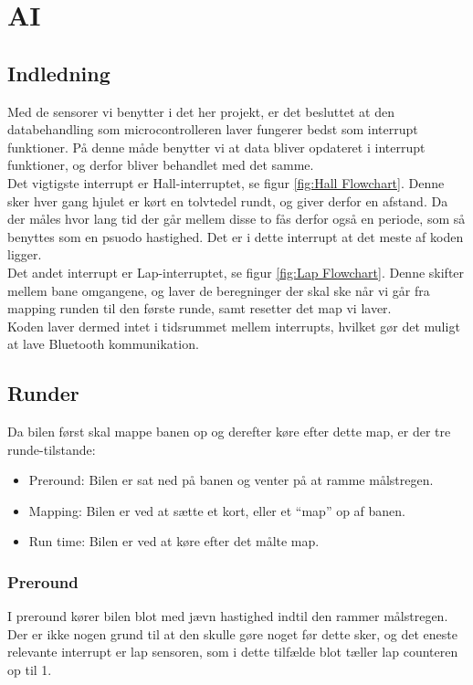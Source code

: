 \section{AI}

\subsection{Indledning}
Med de sensorer vi benytter i det her projekt, er det besluttet at den databehandling som microcontrolleren laver fungerer bedst som interrupt funktioner. På denne måde benytter vi at data bliver opdateret i interrupt funktioner, og derfor bliver behandlet med det samme.
\\

Det vigtigste interrupt er Hall-interruptet, se figur \ref{fig:Hall Flowchart}. Denne sker hver gang hjulet er kørt en tolvtedel rundt, og giver derfor en afstand. Da der måles hvor lang tid der går mellem disse to fås derfor også en periode, som så benyttes som en psuodo hastighed. Det er i dette interrupt at det meste af koden ligger.
\\

Det andet interrupt er Lap-interruptet, se figur \ref{fig:Lap Flowchart}. Denne skifter mellem bane omgangene, og laver de beregninger der skal ske når vi går fra mapping runden til den første runde, samt resetter det map vi laver.
\\

Koden laver dermed intet  i tidsrummet mellem interrupts, hvilket gør det muligt at lave Bluetooth kommunikation.

\subsection{Runder}

Da bilen først skal mappe banen op og derefter køre efter dette map, er der tre runde-tilstande:

\begin{itemize}
\item Preround: Bilen er sat ned på banen og venter på at ramme målstregen.
\item Mapping: Bilen er ved at sætte et kort, eller et ``map'' op af banen.
\item Run time: Bilen er ved at køre efter det målte map.
\end{itemize}

\subsubsection{Preround}
I preround kører bilen blot med jævn hastighed indtil den rammer målstregen. Der er ikke nogen grund til at den skulle gøre noget før dette sker, og det eneste relevante interrupt er lap sensoren, som i dette tilfælde blot tæller lap counteren op til 1.

